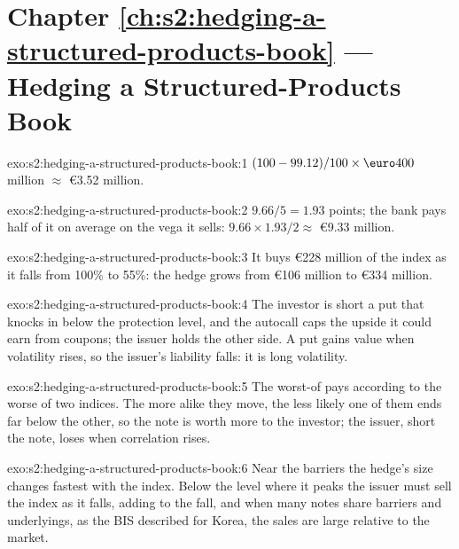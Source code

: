 \section*{Chapter \ref{ch:s2:hedging-a-structured-products-book} --- Hedging a Structured-Products Book}

\begin{solution}{exo:s2:hedging-a-structured-products-book:1}
$(100 - 99.12)/100 \times \text{\euro}400$ million $\approx$ \euro3.52 million.
\end{solution}

\begin{solution}{exo:s2:hedging-a-structured-products-book:2}
$9.66 / 5 = 1.93$ points; the bank pays half of it on average on the vega it sells: $9.66 \times 1.93 / 2 \approx$ \euro9.33 million.
\end{solution}

\begin{solution}{exo:s2:hedging-a-structured-products-book:3}
It buys \euro228 million of the index as it falls from 100\% to 55\%: the hedge grows from \euro106 million to \euro334 million.
\end{solution}

\begin{solution}{exo:s2:hedging-a-structured-products-book:4}
The investor is short a put that knocks in below the protection level, and the autocall caps the upside it could earn from coupons; the issuer holds
the other side. A put gains value when volatility rises, so the issuer's liability falls: it is long volatility.
\end{solution}

\begin{solution}{exo:s2:hedging-a-structured-products-book:5}
The worst-of pays according to the worse of two indices. The more alike they move, the less likely one of them ends far below the other, so the
note is worth more to the investor; the issuer, short the note, loses when correlation rises.
\end{solution}

\begin{solution}{exo:s2:hedging-a-structured-products-book:6}
Near the barriers the hedge's size changes fastest with the index. Below the level where it peaks the issuer must sell the index as it falls, adding
to the fall, and when many notes share barriers and underlyings, as the BIS described for Korea, the sales are large relative to the market.
\end{solution}

